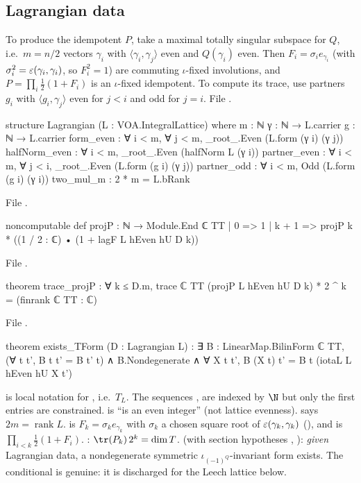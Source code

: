 \subsection{Lagrangian data}

To produce the idempotent $P$, take a maximal totally singular subspace for $Q$, i.e.\ $m=n/2$
vectors $\gamma_i$ with $\langle\gamma_i,\gamma_j\rangle$ even and $Q(\gamma_i)$ even.  Then
$F_i=\sigma_ie_{\gamma_i}$ (with $\sigma_i^2=\varepsilon(\gamma_i,\gamma_i)$, so $F_i^2=1$) are
commuting $\iota$-fixed involutions, and $P=\prod_i\frac12(1+F_i)$ is an $\iota$-fixed idempotent.
To compute its trace, use partners $g_i$ with $\langle g_i,\gamma_j\rangle$ even for $j<i$ and odd
for $j=i$.
\noindent File .
\begin{leancode}
structure Lagrangian (L : VOA.IntegralLattice) where
  m : ℕ
  γ : ℕ → L.carrier
  g : ℕ → L.carrier
  form_even : ∀ i < m, ∀ j < m, _root_.Even (L.form (γ i) (γ j))
  halfNorm_even : ∀ i < m, _root_.Even (halfNorm L (γ i))
  partner_even : ∀ i < m, ∀ j < i, _root_.Even (L.form (g i) (γ j))
  partner_odd : ∀ i < m, Odd (L.form (g i) (γ i))
  two_mul_m : 2 * m = L.bRank
\end{leancode}
\noindent File .
\begin{leancode}
noncomputable def projP : ℕ → Module.End ℂ TT
  | 0 => 1
  | k + 1 => projP k * ((1 / 2 : ℂ) • (1 + lagF L hEven hU D k))
\end{leancode}
\noindent File .
\begin{leancode}
theorem trace_projP : ∀ k ≤ D.m,
    trace ℂ TT (projP L hEven hU D k) * 2 ^ k = (finrank ℂ TT : ℂ)
\end{leancode}
\noindent File .
\begin{leancode}
theorem exists_TForm (D : Lagrangian L) :
    ∃ B : LinearMap.BilinForm ℂ TT, (∀ t t', B t t' = B t' t) ∧ B.Nondegenerate ∧
      ∀ X t t', B (X t) t' = B t (iotaL L hEven hU X t')
\end{leancode}
\begin{dictionary}
 is local notation for , i.e.\ $T_L$.
The sequences ,  are indexed by $\N$ but only the first  entries are
constrained.   is ``is an even integer'' (not lattice evenness).
 says $2m=\operatorname{rank}L$.   is $F_k=\sigma_ke_{\gamma_k}$
with $\sigma_k$ a chosen square root of $\varepsilon(\gamma_k,\gamma_k)$ (), and
 is $\prod_{i<k}\frac12(1+F_i)$.  : $\tr(P_k)\,2^k=\dim T$.
 (with section hypotheses , ): \emph{given} Lagrangian data,
a nondegenerate symmetric $\iota_{(-1)^Q}$-invariant form exists.  The conditional is genuine: it is
discharged for the Leech lattice below.
\end{dictionary}

